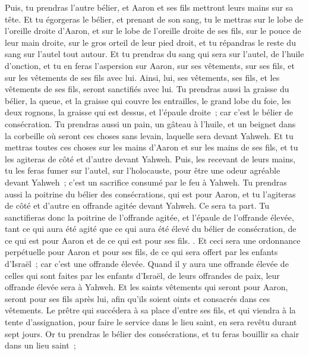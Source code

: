 \begin{multicols}{2}
Puis, tu prendras l'autre bélier, et Aaron et ses fils mettront leurs mains sur sa tête.
Et tu égorgeras le bélier, et prenant de son sang, tu le mettras sur le lobe de l'oreille droite d'Aaron, et sur le lobe de l'oreille droite de ses fils, sur le pouce de leur main droite, sur le gros orteil de leur pied droit, et tu répandras le reste du sang sur l'autel tout autour.
Et tu prendras du sang qui sera sur l'autel, de l'huile d'onction, et tu en feras l'aspersion sur Aaron, sur ses vêtements, sur ses fils, et sur les vêtements de ses fils avec lui. Ainsi, lui, ses vêtements, ses fils, et les vêtements de ses fils, seront sanctifiés avec lui.
Tu prendras aussi la graisse du bélier, la queue, et la graisse qui couvre les entrailles, le grand lobe du foie, les deux rognons, la graisse qui est dessus, et l'épaule droite~; car c'est le bélier de consécration.
Tu prendras aussi un pain, un gâteau à l'huile, et un beignet dans la corbeille où seront ces choses sans levain, laquelle sera devant Yahweh.
Et tu mettras toutes ces choses sur les mains d'Aaron et sur les mains de ses fils, et tu les agiteras de côté et d'autre devant Yahweh.
Puis, les recevant de leurs mains, tu les feras fumer sur l'autel, sur l'holocauste, pour être une odeur agréable devant Yahweh~; c'est un sacrifice consumé par le feu à Yahweh.
Tu prendras aussi la poitrine du bélier des consécrations, qui est pour Aaron, et tu l'agiteras de côté et d'autre en offrande agitée devant Yahweh. Ce sera ta part.
Tu sanctifieras donc la poitrine de l'offrande agitée, et l'épaule de l'offrande élevée, tant ce qui aura été agité que ce qui aura été élevé du bélier de consécration, de ce qui est pour Aaron et de ce qui est pour ses fils. .
Et ceci sera une ordonnance perpétuelle pour Aaron et pour ses fils, de ce qui sera offert par les enfants d'Israël~; car c'est une offrande élevée. Quand il y aura une offrande élevée de celles qui sont faites par les enfants d'Israël, de leurs offrandes de paix, leur offrande élevée sera à Yahweh.
Et les saints vêtements qui seront pour Aaron, seront pour ses fils après lui, afin qu'ils soient oints et consacrés dans ces vêtements.
Le prêtre qui succédera à sa place d'entre ses fils, et qui viendra à la tente d'assignation, pour faire le service dans le lieu saint, en sera revêtu durant sept jours.
Or tu prendras le bélier des consécrations, et tu feras bouillir sa chair dans un lieu saint~;

\end{multicols}
